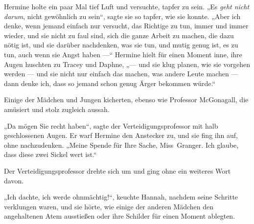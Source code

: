 Hermine holte ein paar Mal tief Luft und versuchte, tapfer zu sein.
„Es \emph{geht nicht darum}, nicht gewöhnlich zu sein“, sagte sie so tapfer, wie sie konnte.
„Aber ich denke, wenn jemand einfach nur versucht, das Richtige zu tun, immer und immer wieder, und sie nicht zu faul sind, sich die ganze Arbeit zu machen, die dazu nötig ist, und sie darüber nachdenken, was sie tun, und mutig genug ist, es zu tun, auch wenn sie Angst haben —“ Hermine hielt für einen Moment inne, ihre Augen huschten zu Tracey und Daphne, „— und sie klug planen, wie sie vorgehen werden — und sie nicht nur einfach das machen, was andere Leute machen — dann denke ich, dass so jemand schon genug Ärger bekommen würde.“

Einige der Mädchen und Jungen kicherten, ebenso wie Professor McGonagall, die amüsiert und stolz zugleich aussah.

„Da mögen Sie recht haben“, sagte der Verteidigungsprofessor mit halb geschlossenen Augen. Er warf Hermine den Anstecker zu, und sie fing ihn auf, ohne nachzudenken.
„Meine Spende für Ihre Sache, Miss~Granger. Ich glaube, dass diese zwei Sickel wert ist.“

Der Verteidigungsprofessor drehte sich um und ging ohne ein weiteres Wort davon.

„Ich dachte, ich werde ohnmächtig!“, keuchte Hannah, nachdem seine Schritte verklungen waren, und sie hörte, wie einige der anderen Mädchen den angehaltenen Atem ausstießen oder ihre Schilder für einen Moment ablegten.

